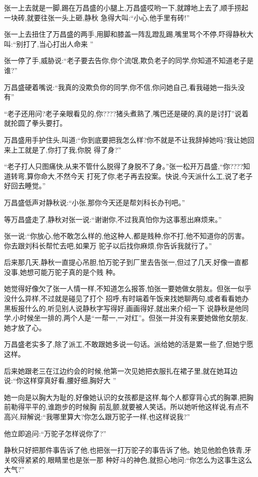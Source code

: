 ﻿\documentclass[12pt]{article}
\begin{document}
张一上去就是一脚,踢在万昌盛的小腿上,万昌盛哎哟一下,就蹲地上去了,顺手捞起一块砖,就要往张一头上砸,静秋
急得大叫:``小心,他手里有砖!''

张一上去扭住了万昌盛的两手,用脚和膝盖一阵乱蹬乱踢,嘴里骂个不停,吓得静秋大叫:``别打了,当心打出人命来
\myrule ''

张一停了手,威胁说:``老子要去告你,你个流氓,欺负老子的同学,你知道不知道老子是谁?''

万昌盛硬着嘴说:``我真的没欺负你的同学,你不信,你问她自己,看我碰她一指头没有\myrule ''

``老子还用问?老子亲眼看见的,你????猪头煮熟了,嘴巴还是硬的,真的是讨打\myrule ''说着就抡圆了拳头要打。

万昌盛用手护住头,叫道:``你到底要把我怎么样?你不就是不让我辞掉她吗?我让她回来上工就是了,你打了我,你脱
得了身?''

``老子打人只图痛快,从来不管什么脱得了身脱不了身。''张一松开万昌盛,``你????知道转弯,算你命大,不然今天
打死了你,老子再去投案。快说,今天派什么工,说了老子好回去睡觉。''

万昌盛低声对静秋说:``小张,那你今天还是帮刘科长办刊吧。''

等万昌盛走了,静秋对张一说:``谢谢你,不过我真怕你为这事惹出麻烦来。''

张一说:``你放心,他不敢怎么样的,他这种人,都是贱种,你不打,他不知道你的厉害。你去跟刘科长帮忙去吧,如果万
驼子以后找你麻烦,你告诉我就行了。''

后来那几天,静秋一直提心吊胆,怕万驼子到厂里去告张一,但过了几天,好像一直都没事,她想可能万驼子真的是个贱
种。

她觉得好像欠了张一人情一样,不知道怎么报答,怕张一要她做女朋友。但张一似乎没什么异样,不过就是碰见了打个
招呼,有时端着午饭来找她聊两句,或者看看她办黑板报什么的,听见别人说静秋字写得好,画画得好,就出来介绍一下
说静秋是他同学,小时候坐一排的,两个人是``一帮一,一对红''。但张一并没有来要她做他女朋友,她才放了心。

万昌盛老实多了,除了派工,不敢跟她多说一句话。派给她的活是累一些了,但她宁愿这样。

后来她跟老三在江边约会的时候,他第一次见她把衣服扎在裙子里,就在她耳边说:``你这样穿真好看,腰好细,胸好大
\myrule ''

她一向是以胸大为耻的,好像她认识的女孩都是这样,每个人都穿背心式的胸罩,把胸前勒得平平的,谁跑步的时候胸
前乱颤,就要被人笑话。所以她听他这样说,有点不高兴,辩解说:``我哪里算大?你怎么跟万驼子一样,也这样说我?''

他立即追问:``万驼子怎样说你了?''

静秋只好把那件事告诉了他,也把张一打万驼子的事告诉了他。她见他脸色铁青,牙关咬得紧紧的,眼睛里也是张一那
种好斗的神色,就担心地问:``你\myrule 怎么为这事生这么大气?''
\end{document}
